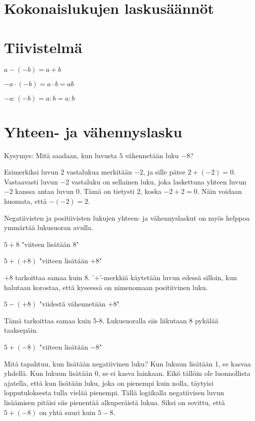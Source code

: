 \section{Kokonaislukujen laskusäännöt}

\section{Tiivistelmä}

$a-(-b)=a+b$

$-a\cdot (-b)=a\cdot b=ab$

$-a:(-b)=a: b=a:b$

\section{Yhteen- ja vähennyslasku}

Kysymys: Mitä saadaan, kun luvusta $5$ vähennetään luku $-8$?


Esimerkiksi luvun $2$ vastalukua merkitään $-2$, ja sille pätee $2+(-2)=0$. Vastaavasti luvun $-2$ vastaluku on sellainen luku, joka laskettuna yhteen luvun $-2$ kanssa antaa luvun $0$. Tämä on tietysti $2$, koska $-2+2=0$. Näin voidaan huomata, että $-(-2)=2$.

Negatiivisten ja positiivisten lukujen yhteen- ja vähennyslaskut on myös helppoa ymmärtää lukusuoran avulla.


$5+8$ "viiteen lisätään $8$"


$5+(+8)$ "viiteen lisätään $+8$"

$+8$ tarkoittaa samaa kuin $8$. '$+$'-merkkiä käytetään luvun edessä silloin, kun halutaan korostaa, että kyseessä on nimenomaan positiivinen luku.


$5-(+8)$ "viidestä vähennetään $+8$"

Tämä tarkoittaa samaa kuin 5-8. Lukusuoralla siis liikutaan 8 pykälää taaksepäin.


$5+(-8)$ "viiteen lisätään $-8$"

Mitä tapahtuu, kun lisätään negatiivinen luku? Kun lukuun lisätään 1, se kasvaa yhdellä. Kun lukuun lisätään 0, se ei kasva lainkaan. Eikö tällöin ole luonnollista ajatella, että kun lisätään luku, joka on pienempi kuin nolla, täytyisi lopputuloksesta tulla vielää pienempi. Tällä logiikalla negatiivisen luvun lisäämisen pitäisi siis pienentää alkuperäistä lukua. Siksi on sovittu, että $5+(-8)$ on yhtä suuri kuin $5-8$.

